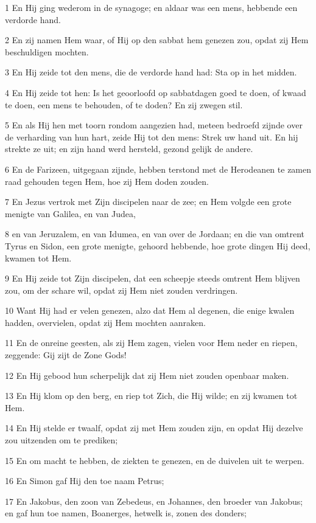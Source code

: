 \par 1 En Hij ging wederom in de synagoge; en aldaar was een mens, hebbende een verdorde hand.
\par 2 En zij namen Hem waar, of Hij op den sabbat hem genezen zou, opdat zij Hem beschuldigen mochten.
\par 3 En Hij zeide tot den mens, die de verdorde hand had: Sta op in het midden.
\par 4 En Hij zeide tot hen: Is het geoorloofd op sabbatdagen goed te doen, of kwaad te doen, een mens te behouden, of te doden? En zij zwegen stil.
\par 5 En als Hij hen met toorn rondom aangezien had, meteen bedroefd zijnde over de verharding van hun hart, zeide Hij tot den mens: Strek uw hand uit. En hij strekte ze uit; en zijn hand werd hersteld, gezond gelijk de andere.
\par 6 En de Farizeen, uitgegaan zijnde, hebben terstond met de Herodeanen te zamen raad gehouden tegen Hem, hoe zij Hem doden zouden.
\par 7 En Jezus vertrok met Zijn discipelen naar de zee; en Hem volgde een grote menigte van Galilea, en van Judea,
\par 8 en van Jeruzalem, en van Idumea, en van over de Jordaan; en die van omtrent Tyrus en Sidon, een grote menigte, gehoord hebbende, hoe grote dingen Hij deed, kwamen tot Hem.
\par 9 En Hij zeide tot Zijn discipelen, dat een scheepje steeds omtrent Hem blijven zou, om der schare wil, opdat zij Hem niet zouden verdringen.
\par 10 Want Hij had er velen genezen, alzo dat Hem al degenen, die enige kwalen hadden, overvielen, opdat zij Hem mochten aanraken.
\par 11 En de onreine geesten, als zij Hem zagen, vielen voor Hem neder en riepen, zeggende: Gij zijt de Zone Gods!
\par 12 En Hij gebood hun scherpelijk dat zij Hem niet zouden openbaar maken.
\par 13 En Hij klom op den berg, en riep tot Zich, die Hij wilde; en zij kwamen tot Hem.
\par 14 En Hij stelde er twaalf, opdat zij met Hem zouden zijn, en opdat Hij dezelve zou uitzenden om te prediken;
\par 15 En om macht te hebben, de ziekten te genezen, en de duivelen uit te werpen.
\par 16 En Simon gaf Hij den toe naam Petrus;
\par 17 En Jakobus, den zoon van Zebedeus, en Johannes, den broeder van Jakobus; en gaf hun toe namen, Boanerges, hetwelk is, zonen des donders;
